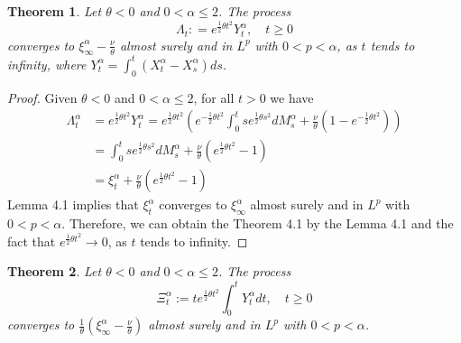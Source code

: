 \documentclass[11pt]{amsart}
\theoremstyle{plain}
\newtheorem{theorem}{Theorem}[section]
\numberwithin{equation}{section}
\begin{document}
\begin{theorem}
Let $\theta<0$ and $0<\alpha\leq 2$. The process
$$
\Lambda_t: = e^{\frac{1}{2}\theta t^2}Y_t^\alpha,\quad t\geq 0
$$
converges to $\xi_\infty^\alpha -\frac{\nu}{\theta}$ almost surely and in $L^p$ with $0<p<\alpha$, as $t$ tends to infinity, where $Y_t^\alpha =\int_0^t (X_t^\alpha-X_s^\alpha)ds$.
\end{theorem}

\begin{proof}
Given $\theta<0$ and $0<\alpha\leq 2$, for all $t>0$ we have
\begin{equation*}
\begin{aligned}
\Lambda_t^\alpha&=e^{\frac{1}{2}\theta t^2}Y_t^\alpha=e^{\frac{1}{2}\theta t^2}\left(e^{-\frac{1}{2}\theta t^2}\int_0^t se^{\frac{1}{2}\theta s^2}dM_s^\alpha +\frac{\nu}{\theta}(1-e^{-\frac{1}{2}\theta t^2})\right)\\
&=\int_0^t  se^{\frac{1}{2}\theta s^2}dM_s^\alpha +\frac{\nu}{\theta}\left(e^{\frac{1}{2}\theta t^2}-1\right)\\
&=\xi_t^\alpha+\frac{\nu}{\theta}\left(e^{\frac{1}{2}\theta t^2}-1\right)
\end{aligned}
\end{equation*}
Lemma 4.1 implies that $\xi_t^\alpha$ converges to $\xi_\infty^\alpha$ almost surely and in $L^p$ with $0<p<\alpha$. Therefore, we can obtain the Theorem 4.1 by the Lemma 4.1 and the fact that $e^{\frac{1}{2}\theta t^2}\rightarrow 0$, as $t$ tends to infinity. 
\end{proof}

\begin{theorem}
Let $\theta<0$ and $0<\alpha\leq 2$. The process
$$
\Xi_t^\alpha :=te^{\frac{1}{2}\theta t^2}\int_0^t Y_t^\alpha dt,\quad t\geq 0
$$
converges to $\frac{1}{\theta}(\xi_\infty^\alpha-\frac{\nu}{\theta})$ almost surely and in $L^p$ with $0<p<\alpha$.
\end{theorem}
\end{document}
